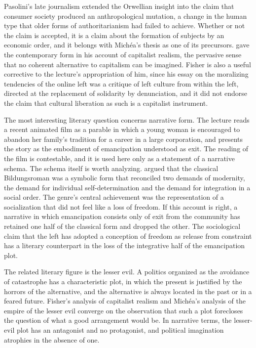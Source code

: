 \documentclass[12pt]{article}
\begin{document}
Pasolini's late journalism \citep{pasolini} extended the Orwellian insight into the claim that consumer society produced an anthropological mutation, a change in the human type that older forms of authoritarianism had failed to achieve. Whether or not the claim is accepted, it is a claim about the formation of subjects by an economic order, and it belongs with Michéa's thesis as one of its precursors. \citet{fisher2009} gave the contemporary form in his account of capitalist realism, the pervasive sense that no coherent alternative to capitalism can be imagined. Fisher is also a useful corrective to the lecture's appropriation of him, since his essay on the moralizing tendencies of the online left \citep{fisher2013} was a critique of left culture from within the left, directed at the replacement of solidarity by denunciation, and it did not endorse the claim that cultural liberation as such is a capitalist instrument.

The most interesting literary question concerns narrative form. The lecture reads a recent animated film as a parable in which a young woman is encouraged to abandon her family's tradition for a career in a large corporation, and presents the story as the embodiment of emancipation understood as exit. The reading of the film is contestable, and it is used here only as a statement of a narrative schema. The schema itself is worth analyzing. \citet{moretti} argued that the classical Bildungsroman was a symbolic form that reconciled two demands of modernity, the demand for individual self-determination and the demand for integration in a social order. The genre's central achievement was the representation of a socialization that did not feel like a loss of freedom. If this account is right, a narrative in which emancipation consists only of exit from the community has retained one half of the classical form and dropped the other. The sociological claim that the left has adopted a conception of freedom as release from constraint has a literary counterpart in the loss of the integrative half of the emancipation plot.

The related literary figure is the lesser evil. A politics organized as the avoidance of catastrophe has a characteristic plot, in which the present is justified by the horrors of the alternative, and the alternative is always located in the past or in a feared future. Fisher's analysis of capitalist realism and Michéa's analysis of the empire of the lesser evil converge on the observation that such a plot forecloses the question of what a good arrangement would be. In narrative terms, the lesser-evil plot has an antagonist and no protagonist, and political imagination atrophies in the absence of one.
\end{document}
